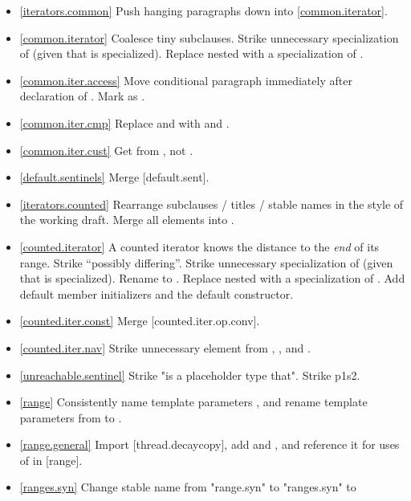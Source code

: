 \begin{itemize}
\item \ref{iterators.common} Push hanging paragraphs down
  into \ref{common.iterator}.
\item \ref{common.iterator} Coalesce tiny subclauses. Strike unnecessary
  specialization of  (given that 
  is specialized). Replace nested  with a specialization
  of .
\item \ref{common.iter.access} Move conditional  paragraph
  immediately after declaration of .
  Mark  as .
\item \ref{common.iter.cmp} Replace  and  with
   and .
\item \ref{common.iter.cust} Get  from , not .
\item \ref{default.sentinels} Merge [default.sent].
\item \ref{iterators.counted} Rearrange subclauses / titles / stable names
  in the style of the working draft. Merge all \returns elements into \effects.
\item \ref{counted.iterator} A counted iterator knows the distance to the
  \textit{end} of its range. Strike ``possibly differing''.
  Strike unnecessary specialization of 
  (given that  is specialized).
  Rename  to . Replace nested 
  with a specialization of .
  Add default member initializers and  the default constructor.
\item \ref{counted.iter.const} Merge [counted.iter.op.conv].
\item \ref{counted.iter.nav} Strike unnecessary \expects element from
  , , and
  .
\item \ref{unreachable.sentinel} Strike "is a placeholder type that".
  Strike p1s2.
\item \ref{range} Consistently name
   template parameters ,
  and rename  template parameters from  to .
\item \ref{range.general} Import [thread.decaycopy], add  and
  , and reference it for uses of  in [range].
\item \ref{ranges.syn} Change stable name from "range.syn" to "ranges.syn" to

\end{itemize}
